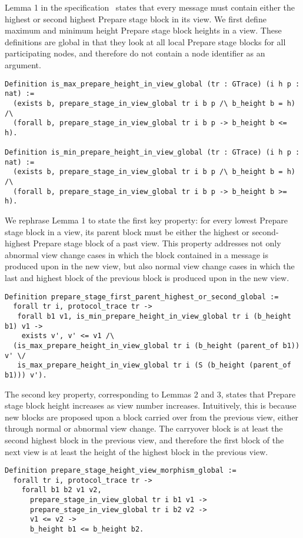 \documentclass{easychair}
\begin{document}
Lemma 1 in the specification~\cite{GiskardSpec} states that every  message must contain either the highest or second highest Prepare stage block in its view. We first define maximum and minimum height Prepare stage block heights in a view. These definitions are global in that they look at all local Prepare stage blocks for all participating nodes, and therefore do not contain a node identifier  as an argument. 

\begin{lstlisting}[language=Coq]
Definition is_max_prepare_height_in_view_global (tr : GTrace) (i h p : nat) :=
  (exists b, prepare_stage_in_view_global tr i b p /\ b_height b = h) /\
  (forall b, prepare_stage_in_view_global tr i b p -> b_height b <= h).

Definition is_min_prepare_height_in_view_global (tr : GTrace) (i h p : nat) :=
  (exists b, prepare_stage_in_view_global tr i b p /\ b_height b = h) /\
  (forall b, prepare_stage_in_view_global tr i b p -> b_height b >= h).
\end{lstlisting}

\noindent
We rephrase Lemma 1 to state the first key property: for every lowest Prepare stage block in a view, its parent block must be either the highest or second-highest Prepare stage block of a past view. This property addresses not only abnormal view change cases in which the block contained in a  message is produced upon in the new view, but also normal view change cases in which the last and highest block of the previous block is produced upon in the new view. 
\begin{lstlisting}
Definition prepare_stage_first_parent_highest_or_second_global :=
  forall tr i, protocol_trace tr ->
   forall b1 v1, is_min_prepare_height_in_view_global tr i (b_height b1) v1 ->
    exists v', v' <= v1 /\
  (is_max_prepare_height_in_view_global tr i (b_height (parent_of b1)) v' \/
   is_max_prepare_height_in_view_global tr i (S (b_height (parent_of b1))) v').
\end{lstlisting}

\noindent
The second key property, corresponding to Lemmas 2 and 3, states that Prepare stage block height increases as view number increases. Intuitively, this is because new blocks are proposed upon a block carried over from the previous view, either through normal or abnormal view change. The carryover block is at least the second highest block in the previous view, and therefore the first block of the next view is at least the height of the highest block in the previous view.
\begin{lstlisting}[language=Coq]
Definition prepare_stage_height_view_morphism_global :=
  forall tr i, protocol_trace tr ->
    forall b1 b2 v1 v2,
      prepare_stage_in_view_global tr i b1 v1 ->
      prepare_stage_in_view_global tr i b2 v2 ->
      v1 <= v2 ->
      b_height b1 <= b_height b2.
\end{lstlisting}
\end{document}
